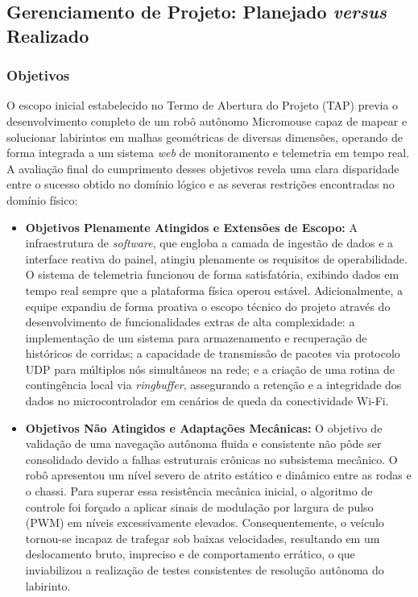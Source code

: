\subsection{Gerenciamento de Projeto: Planejado \textit{versus} Realizado}
\label{subsec:planejado_realizado}

\subsubsection{Objetivos}
\label{subsubsec:objetivos_proj}

O escopo inicial estabelecido no Termo de Abertura do Projeto (TAP) previa o desenvolvimento completo de um robô autônomo Micromouse capaz de mapear e solucionar labirintos em malhas geométricas de diversas dimensões, operando de forma integrada a um sistema \textit{web} de monitoramento e telemetria em tempo real. A avaliação final do cumprimento desses objetivos revela uma clara disparidade entre o sucesso obtido no domínio lógico e as severas restrições encontradas no domínio físico:

\begin{itemize}
    \item \textbf{Objetivos Plenamente Atingidos e Extensões de Escopo:} A infraestrutura de \textit{software}, que engloba a camada de ingestão de dados e a interface reativa do painel, atingiu plenamente os requisitos de operabilidade. O sistema de telemetria funcionou de forma satisfatória, exibindo dados em tempo real sempre que a plataforma física operou estável. Adicionalmente, a equipe expandiu de forma proativa o escopo técnico do projeto através do desenvolvimento de funcionalidades extras de alta complexidade: a implementação de um sistema para armazenamento e recuperação de históricos de corridas; a capacidade de transmissão de pacotes via protocolo UDP para múltiplos nós simultâneos na rede; e a criação de uma rotina de contingência local via \textit{ringbuffer}, assegurando a retenção e a integridade dos dados no microcontrolador em cenários de queda da conectividade Wi-Fi.
    
    \item \textbf{Objetivos Não Atingidos e Adaptações Mecânicas:} O objetivo de validação de uma navegação autônoma fluida e consistente não pôde ser consolidado devido a falhas estruturais crônicas no subsistema mecânico. O robô apresentou um nível severo de atrito estático e dinâmico entre as rodas e o chassi. Para superar essa resistência mecânica inicial, o algoritmo de controle foi forçado a aplicar sinais de modulação por largura de pulso (PWM) em níveis excessivamente elevados. Consequentemente, o veículo tornou-se incapaz de trafegar sob baixas velocidades, resultando em um deslocamento bruto, impreciso e de comportamento errático, o que inviabilizou a realização de testes consistentes de resolução autônoma do labirinto.
\end{itemize}

